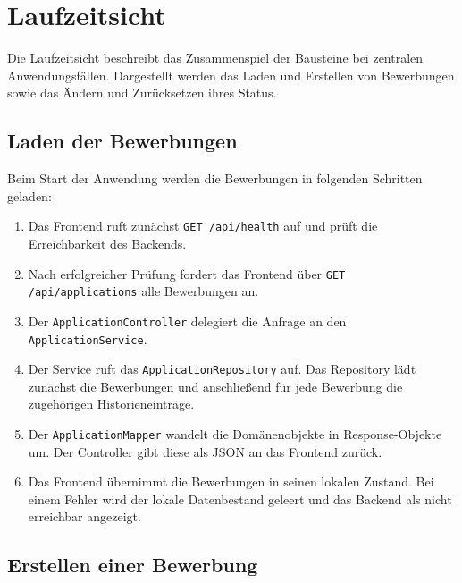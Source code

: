 \documentclass[a4paper,11pt]{article}
\begin{document}

\section{Laufzeitsicht}
\label{sec:runtime-view}

Die Laufzeitsicht beschreibt das Zusammenspiel der Bausteine bei zentralen Anwendungsfällen.
Dargestellt werden das Laden und Erstellen von Bewerbungen sowie das Ändern und Zurücksetzen ihres Status.


\subsection{Laden der Bewerbungen}

Beim Start der Anwendung werden die Bewerbungen in folgenden Schritten geladen:

\begin{enumerate}[leftmargin=1.6em,itemsep=0.3em]

  \item Das Frontend ruft zunächst \texttt{GET /api/health} auf und prüft die Erreichbarkeit des Backends.

  \item Nach erfolgreicher Prüfung fordert das Frontend über \texttt{GET /api/applications} alle Bewerbungen an.

  \item Der \texttt{ApplicationController} delegiert die Anfrage an den \texttt{ApplicationService}.

  \item Der Service ruft das \texttt{ApplicationRepository} auf.
  Das Repository lädt zunächst die Bewerbungen und anschließend für jede Bewerbung die zugehörigen Historieneinträge.

  \item Der \texttt{ApplicationMapper} wandelt die Domänenobjekte in Response-Objekte um.
  Der Controller gibt diese als JSON an das Frontend zurück.

  \item Das Frontend übernimmt die Bewerbungen in seinen lokalen Zustand.
  Bei einem Fehler wird der lokale Datenbestand geleert und das Backend als nicht erreichbar angezeigt.

\end{enumerate}


\subsection{Erstellen einer Bewerbung}
\end{document}
